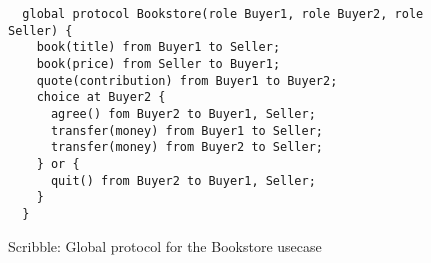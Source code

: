 \begin{figure}[t]
\begin{lstlisting}
  global protocol Bookstore(role Buyer1, role Buyer2, role Seller) {
    book(title) from Buyer1 to Seller;
    book(price) from Seller to Buyer1;
    quote(contribution) from Buyer1 to Buyer2;
    choice at Buyer2 {
      agree() fom Buyer2 to Buyer1, Seller;
      transfer(money) from Buyer1 to Seller;
      transfer(money) from Buyer2 to Seller;
    } or {
      quit() from Buyer2 to Buyer1, Seller;
    }
  }
\end{lstlisting}
\caption{Scribble: Global protocol for the Bookstore usecase}
\label{fig:scribble_bs}
\end{figure}
